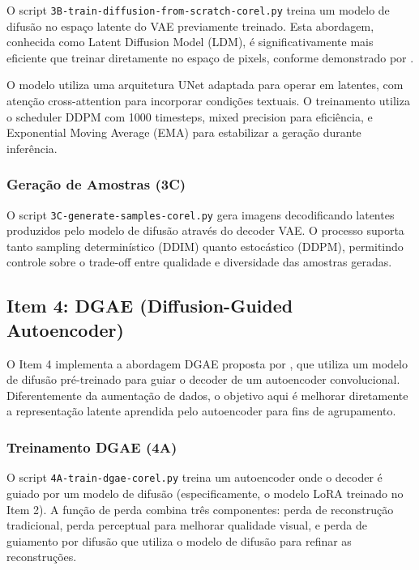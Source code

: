 O script \texttt{3B-train-diffusion-from-scratch-corel.py} treina um modelo de difusão no espaço latente do VAE previamente treinado. Esta abordagem, conhecida como Latent Diffusion Model (LDM), é significativamente mais eficiente que treinar diretamente no espaço de pixels, conforme demonstrado por \cite{rombach2022high}.

O modelo utiliza uma arquitetura UNet adaptada para operar em latentes, com atenção cross-attention para incorporar condições textuais. O treinamento utiliza o scheduler DDPM com 1000 timesteps, mixed precision para eficiência, e Exponential Moving Average (EMA) para estabilizar a geração durante inferência.

\subsubsection{Geração de Amostras (3C)}

O script \texttt{3C-generate-samples-corel.py} gera imagens decodificando latentes produzidos pelo modelo de difusão através do decoder VAE. O processo suporta tanto sampling determinístico (DDIM) quanto estocástico (DDPM), permitindo controle sobre o trade-off entre qualidade e diversidade das amostras geradas.

\subsection{Item 4: DGAE (Diffusion-Guided Autoencoder)}

O Item 4 implementa a abordagem DGAE proposta por \cite{liu2025dgae}, que utiliza um modelo de difusão pré-treinado para guiar o decoder de um autoencoder convolucional. Diferentemente da aumentação de dados, o objetivo aqui é melhorar diretamente a representação latente aprendida pelo autoencoder para fins de agrupamento.

\subsubsection{Treinamento DGAE (4A)}

O script \texttt{4A-train-dgae-corel.py} treina um autoencoder onde o decoder é guiado por um modelo de difusão (especificamente, o modelo LoRA treinado no Item 2). A função de perda combina três componentes: perda de reconstrução tradicional, perda perceptual para melhorar qualidade visual, e perda de guiamento por difusão que utiliza o modelo de difusão para refinar as reconstruções.

